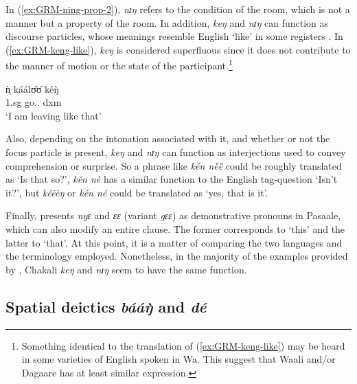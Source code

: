 \begin{exe}
\begin{exe}
\begin{exe}
{\begin{exe}
\begin{exe}
\begin{exe}
\begin{exe}
\begin{exe}
\begin{exe}
\begin{exe}
\begin{xlist}
\begin{exe}
\begin{exe}
\begin{exe}
\begin{exe}
\begin{exe}
\begin{exe}
\begin{exe}
\begin{exe}
\begin{exe}
\begin{exe}
\begin{exe}
\begin{exe}
\begin{exe}
\begin{exe}
\begin{exe}
In (\ref{ex:GRM-ning-prop-2}), {\it nɪŋ} refers to the condition of  the room,
which is not a manner  but a property of the room. 
In addition, {\it keŋ} and 
{\it nɪŋ} can function as  discourse particles, whose
meanings resemble   English `like' in some registers \citep{Muff02}. In
(\ref{ex:GRM-keng-like}), {\it keŋ} is considered superfluous since it does not
contribute to the manner of  motion or the state of the
participant.\footnote{Something identical to the translation of
(\ref{ex:GRM-keng-like}) may be heard in some varieties of  English spoken in 
Wa.
This suggest that Waali and/or Dagaare has at least  similar 
expression.} 
 
 \ea\label{ex:GRM-keng-like} 
 \gll ǹ̩ káálʊ̄ʊ̄ kéŋ̀ \\
 {\sc 1.sg} go.{\ipfv .\foc}  {\sc dxm}\\
 \glt `I am leaving like that'
\z

Also, depending on the intonation associated with it, and whether or not  the
focus
particle  is  present, {\it keŋ} and {\it nɪŋ} can function as
interjections used to convey comprehension or surprise. So a phrase like {\it 
kén nȅȅ} could be roughly translated as `Is that so?', {\it kén nè}   has a
similar function to the English  tag-question `Isn't it?', but {\it kéēèŋ} or
{\it kén né} could be translated as `yes, that is it'. 

Finally, \citet{Mcgi99} presents  {\it nyɛ} and {\it ɛɛ} (variant {\it gɛɛ}) as
demonstrative pronouns in Pasaale, which can also modify an entire clause. The
former
corresponds to `this' and the latter to `that'. At this point, it is a matter of
comparing the two languages and the terminology employed.  Nonetheless, in the
majority of the examples provided by \citet{Mcgi99}, Chakali {\it keŋ} and {\it 
nɪŋ} seem to have the same function. 


\subsection{Spatial deictics {\it bááŋ̀} and  {\it dé}}
\label{sec:GRM-deic-adv}
 


\end{exe}
\end{exe}
\end{exe}
\end{exe}
\end{exe}
\end{exe}
\end{exe}
\end{exe}
\end{exe}
\end{exe}
\end{exe}
\end{exe}
\end{exe}
\end{exe}
\end{exe}
\end{xlist}
\end{exe}
\end{exe}
\end{exe}
\end{exe}
\end{exe}
\end{exe}
\end{exe}}
\end{exe}
\end{exe}
\end{exe}
